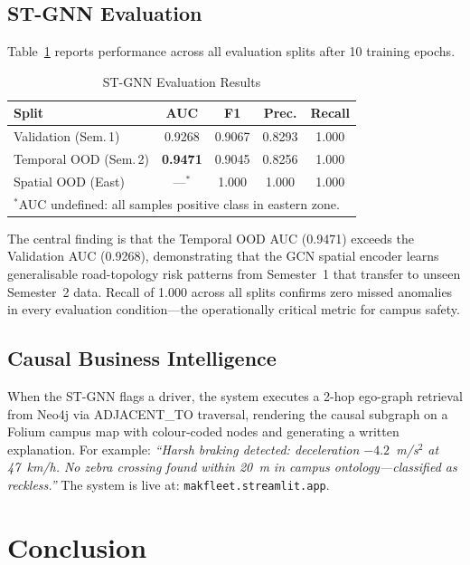 \documentclass[conference]{IEEEtran}
\begin{document}
\subsection{ST-GNN Evaluation}

Table~\ref{tab:results} reports performance across all evaluation
splits after 10 training epochs.

\begin{table}[t]
\caption{ST-GNN Evaluation Results}
\label{tab:results}
\centering
\begin{tabular}{|l|c|c|c|c|}
\hline
\textbf{Split} & \textbf{AUC} & \textbf{F1} &
\textbf{Prec.} & \textbf{Recall} \\
\hline
Validation (Sem.\,1) & 0.9268 & 0.9067 & 0.8293 & 1.000 \\
\hline
Temporal OOD (Sem.\,2) & \textbf{0.9471} & 0.9045 & 0.8256 & 1.000 \\
\hline
Spatial OOD (East) & ---$^{*}$ & 1.000 & 1.000 & 1.000 \\
\hline
\multicolumn{5}{l}{\footnotesize $^{*}$AUC undefined: all samples
positive class in eastern zone.}
\end{tabular}
\end{table}

The central finding is that the Temporal OOD AUC (0.9471) exceeds
the Validation AUC (0.9268), demonstrating that the GCN spatial
encoder learns generalisable road-topology risk patterns from
Semester~1 that transfer to unseen Semester~2 data. Recall of 1.000
across all splits confirms zero missed anomalies in every evaluation
condition---the operationally critical metric for campus safety.

\subsection{Causal Business Intelligence}

When the ST-GNN flags a driver, the system executes a 2-hop
ego-graph retrieval from Neo4j via ADJACENT\_TO traversal, rendering
the causal subgraph on a Folium campus map with colour-coded nodes
and generating a written explanation. For example: \textit{``Harsh
braking detected: deceleration $-4.2$~m/s$^2$ at 47~km/h. No zebra
crossing found within 20~m in campus ontology---classified as
reckless.''} The system is live at:
\texttt{makfleet.streamlit.app}.


\section{Conclusion}
\end{document}

